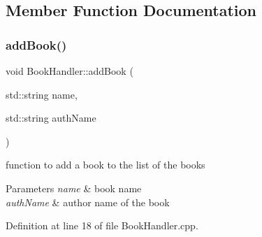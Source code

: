 \subsection{Member Function Documentation}
\mbox{\label{class_book_handler_a29517e8c55796a94f29c48d6971e9f1d}} 
\subsubsection{\texorpdfstring{add\+Book()}{addBook()}\hspace{0.1cm}{\footnotesize\ttfamily [1/2]}}
{\footnotesize\ttfamily void Book\+Handler\+::add\+Book (\begin{DoxyParamCaption}\item[{std\+::string}]{name,  }\item[{std\+::string}]{auth\+Name }\end{DoxyParamCaption})}

function to add a book to the list of the books 
\begin{DoxyParams}{Parameters}
{\em name} & book name \\
\hline
{\em auth\+Name} & author name of the book \\
\hline
\end{DoxyParams}


Definition at line 18 of file Book\+Handler.\+cpp.


